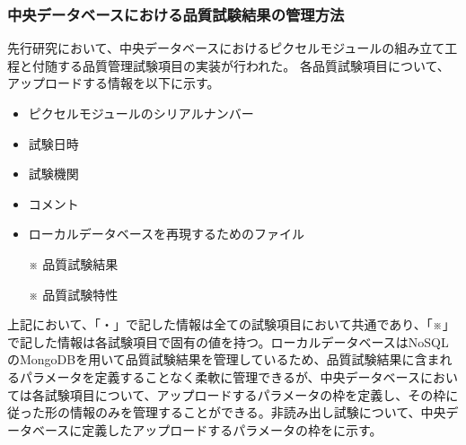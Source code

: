 \subsubsection{中央データベースにおける品質試験結果の管理方法}

先行研究において、中央データベースにおけるピクセルモジュールの組み立て工程と付随する品質管理試験項目の実装が行われた。
各品質試験項目について、アップロードする情報を以下に示す。
\begin{itemize}
  \item ピクセルモジュールのシリアルナンバー
  \item 試験日時
  \item 試験機関
  \item コメント
  \item ローカルデータベースを再現するためのファイル
  \item[※] 品質試験結果
  \item[※] 品質試験特性
\end{itemize}
上記において、「・」で記した情報は全ての試験項目において共通であり、「※」で記した情報は各試験項目で固有の値を持つ。ローカルデータベースはNoSQLのMongoDBを用いて品質試験結果を管理しているため、品質試験結果に含まれるパラメータを定義することなく柔軟に管理できるが、中央データベースにおいては各試験項目について、アップロードするパラメータの枠を定義し、その枠に従った形の情報のみを管理することができる。非読み出し試験について、中央データベースに定義したアップロードするパラメータの枠をに示す。

